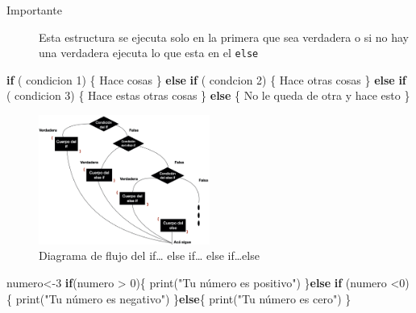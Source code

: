 \documentclass[
]{book}
\newenvironment{Shaded}{\begin{snugshade}}{\end{snugshade}}
\newcommand{\ControlFlowTok}[1]{\textcolor[rgb]{0.13,0.29,0.53}{\textbf{#1}}}
\newcommand{\DecValTok}[1]{\textcolor[rgb]{0.00,0.00,0.81}{#1}}
\newcommand{\FunctionTok}[1]{\textcolor[rgb]{0.00,0.00,0.00}{#1}}
\newcommand{\NormalTok}[1]{#1}
\newcommand{\OtherTok}[1]{\textcolor[rgb]{0.56,0.35,0.01}{#1}}
\newcommand{\SpecialCharTok}[1]{\textcolor[rgb]{0.00,0.00,0.00}{#1}}
\newcommand{\StringTok}[1]{\textcolor[rgb]{0.31,0.60,0.02}{#1}}
\begin{document}
\begin{description}
\item[Importante]
Esta estructura se ejecuta solo en la primera que sea verdadera o si no hay una verdadera ejecuta lo que esta en el \texttt{else}
\end{description}

\begin{Shaded}
\begin{Highlighting}[]
\ControlFlowTok{if}\NormalTok{ ( condicion }\DecValTok{1}\NormalTok{) \{}
\NormalTok{Hace cosas}
\NormalTok{\} }\ControlFlowTok{else} \ControlFlowTok{if}\NormalTok{ ( condcion }\DecValTok{2}\NormalTok{) \{}
\NormalTok{Hace otras cosas}
\NormalTok{\} }\ControlFlowTok{else} \ControlFlowTok{if}\NormalTok{ ( condicion }\DecValTok{3}\NormalTok{) \{}
\NormalTok{Hace estas otras cosas}
\NormalTok{\} }\ControlFlowTok{else}\NormalTok{ \{}
\NormalTok{No le queda de otra y hace esto}
\NormalTok{\}}
\end{Highlighting}
\end{Shaded}

\begin{figure}
\hypertarget{id}{%
\centering
\includegraphics[width=0.5\textwidth,height=0.5\textheight]{If_else_else_if.001.jpeg}
\caption{Diagrama de flujo del if\ldots{} else if\ldots{} else if\ldots else}\label{id}
}
\end{figure}

\begin{Shaded}
\begin{Highlighting}[]
\NormalTok{numero}\OtherTok{\textless{}{-}}\DecValTok{3}
\ControlFlowTok{if}\NormalTok{(numero }\SpecialCharTok{\textgreater{}} \DecValTok{0}\NormalTok{)\{}
  \FunctionTok{print}\NormalTok{(}\StringTok{"Tu número es positivo"}\NormalTok{)}
\NormalTok{\}}\ControlFlowTok{else} \ControlFlowTok{if}\NormalTok{ (numero }\SpecialCharTok{\textless{}}\DecValTok{0}\NormalTok{)\{}
  \FunctionTok{print}\NormalTok{(}\StringTok{"Tu número es negativo"}\NormalTok{)}
\NormalTok{\}}\ControlFlowTok{else}\NormalTok{\{}
  \FunctionTok{print}\NormalTok{(}\StringTok{"Tu número es cero"}\NormalTok{)}
\NormalTok{\}}
\end{Highlighting}
\end{Shaded}
\end{document}
